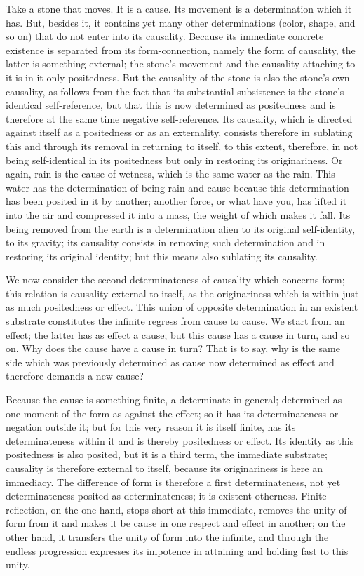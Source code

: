 Take a stone that moves. It is a cause.
Its movement is a determination which it has.
But, besides it, it contains yet many other determinations
(color, shape, and so on)
that do not enter into its causality.
Because its immediate concrete existence is
separated from its form-connection,
namely the form of causality,
the latter is something external;
the stone's movement and the causality attaching to it
is in it only positedness.
But the causality of the stone is also the stone's own causality,
as follows from the fact that its substantial subsistence is
the stone's identical self-reference,
but that this is now determined as positedness
and is therefore at the same time negative self-reference.
Its causality, which is directed against itself as
a positedness or as an externality,
consists therefore in sublating this
and through its removal in returning to itself,
to this extent, therefore, in not
being self-identical in its positedness
but only in restoring its originariness.
Or again, rain is the cause of wetness,
which is the same water as the rain.
This water has the determination of being rain and cause
because this determination has been posited in it by another;
another force, or what have you, has lifted it into the air
and compressed it into a mass, the weight of which makes it fall.
Its being removed from the earth is
a determination alien to its original self-identity, to its gravity;
its causality consists in removing such determination
and in restoring its original identity;
but this means also sublating its causality.

We now consider the second determinateness of causality
which concerns form;
this relation is causality external to itself,
as the originariness which is
within just as much positedness or effect.
This union of opposite determination
in an existent substrate constitutes
the infinite regress from cause to cause.
We start from an effect;
the latter has as effect a cause;
but this cause has a cause in turn, and so on.
Why does the cause have a cause in turn?
That is to say, why is the same side
which was previously determined as cause
now determined as effect
and therefore demands a new cause?

Because the cause is something finite,
a determinate in general;
determined as one moment of the form
as against the effect;
so it has its determinateness or negation outside it;
but for this very reason it is itself finite,
has its determinateness within it
and is thereby positedness or effect.
Its identity as this positedness is also posited,
but it is a third term, the immediate substrate;
causality is therefore external to itself,
because its originariness is here an immediacy.
The difference of form is therefore
a first determinateness,
not yet determinateness posited as determinateness;
it is existent otherness.
Finite reflection, on the one hand,
stops short at this immediate,
removes the unity of form from it
and makes it be cause in one respect
and effect in another;
on the other hand, it transfers
the unity of form into the infinite,
and through the endless progression
expresses its impotence in attaining
and holding fast to this unity.

